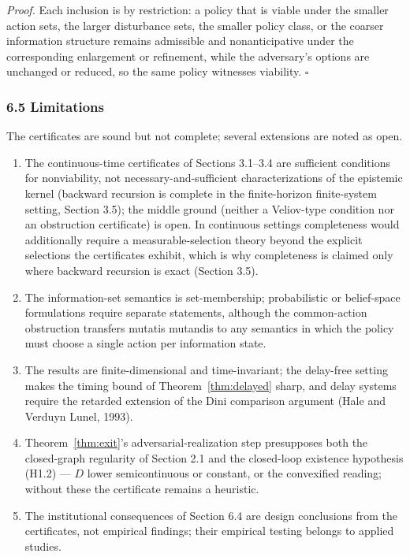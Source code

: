 \documentclass[11pt]{article}
\theoremstyle{definition}
\providecommand{\tightlist}{\setlength{\itemsep}{0pt}\setlength{\parskip}{0pt}}
\begin{document}
\emph{Proof.} Each inclusion is by restriction: a policy that is viable
under the smaller action sets, the larger disturbance sets, the smaller
policy class, or the coarser information structure remains admissible
and nonanticipative under the corresponding enlargement or refinement,
while the adversary's options are unchanged or reduced, so the same
policy witnesses viability. \ensuremath{\square}

\subsubsection{6.5 Limitations}\label{limitations}

The certificates are sound but not complete; several extensions are noted as open.

\begin{enumerate}
\def\labelenumi{(\roman{enumi})}
\tightlist
\item
  The continuous-time certificates of Sections 3.1--3.4 are sufficient conditions for nonviability, not necessary-and-sufficient characterizations of the epistemic kernel (backward recursion is complete in the finite-horizon finite-system setting, Section 3.5); the middle ground (neither a Veliov-type condition nor an obstruction certificate) is open. In
continuous settings completeness would additionally require a
measurable-selection theory beyond the explicit selections the
certificates exhibit, which is why completeness is claimed only where
backward recursion is exact (Section 3.5).
\item
  The information-set semantics is set-membership; probabilistic or belief-space formulations require separate statements, although the common-action obstruction transfers mutatis mutandis to any semantics in which the policy must choose a single action per information state.
\item
  The results are finite-dimensional and time-invariant; the delay-free setting makes the timing bound of Theorem~\ref{thm:delayed} sharp, and delay systems require the retarded extension of the Dini comparison argument (Hale and Verduyn Lunel, 1993).
\item
  Theorem~\ref{thm:exit}'s adversarial-realization step presupposes both the closed-graph regularity of Section 2.1 and the closed-loop existence hypothesis (H1.2) --- \(D\) lower semicontinuous or constant, or the convexified reading; without these the certificate remains a heuristic.
\item
  The institutional consequences of Section 6.4 are design conclusions from the certificates, not empirical findings; their empirical testing belongs to applied studies.
\end{enumerate}
\end{document}
